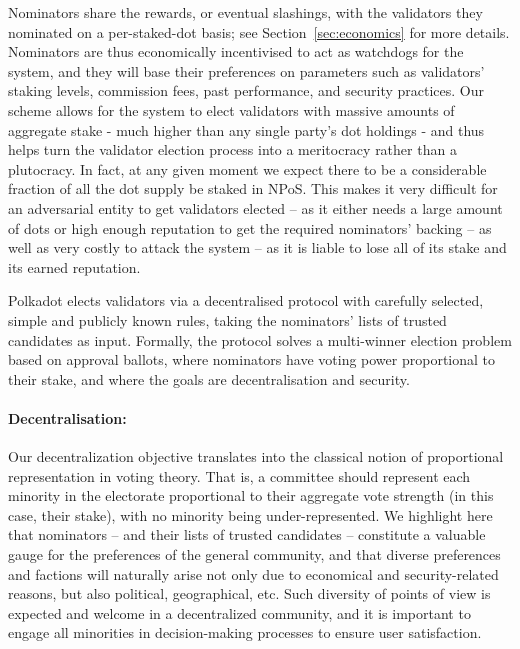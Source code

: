 Nominators share the rewards, or eventual slashings, with the validators they nominated on a per-staked-dot basis; 
see Section~\ref{sec:economics} for more details. 
Nominators are thus economically incentivised to act as watchdogs for the system, and they will base their preferences 
on parameters such as validators' staking levels, commission fees, past performance, and security practices.
Our scheme allows for the system to elect validators with massive amounts of aggregate stake
- much higher than any single party's dot holdings -
and thus helps turn the validator election process into a meritocracy rather than a plutocracy.
In fact, at any given moment we expect there to be a considerable fraction of all the dot supply be staked in NPoS.
This makes it very difficult for an adversarial entity to get validators elected 
-- as it either needs a large amount of dots or high enough reputation to get the required nominators' backing -- 
as well as very costly to attack the system -- as it is liable to lose all of its stake and its earned reputation.

Polkadot elects validators via a decentralised protocol with carefully selected, simple and publicly known rules,
taking the nominators' lists of trusted candidates as input. Formally, the protocol solves a multi-winner election
problem based on approval ballots, where nominators have voting power proportional to their stake,
and where the goals are decentralisation and security.

\paragraph{Decentralisation:}  
Our decentralization objective translates into the classical notion of proportional representation in voting theory.
That is, a committee should represent each minority in the electorate proportional to their aggregate vote strength (in this case, their stake), with no minority being under-represented. 
We highlight here that nominators -- and their lists of trusted candidates -- constitute a valuable gauge for the preferences of the general community, and that diverse preferences and factions will naturally arise not only due to economical and security-related reasons, but also political, geographical, etc. Such diversity of points of view is expected and welcome in a decentralized community, and it is important to engage all minorities in decision-making processes to ensure user satisfaction. 

